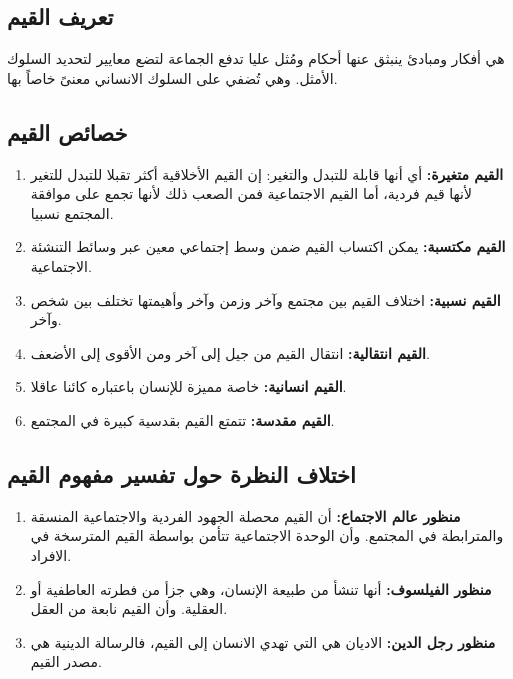 \subsection{تعريف القيم}
هي أفكار ومبادئ ينبثق عنها أحكام ومُثل عليا تدفع الجماعة لتضع معايير لتحديد
    السلوك الأمثل. وهي تُضفي على السلوك الانساني معنىً خاصاً بها.

\subsection{خصائص القيم}
\begin{enumerate}
    \item\textbf{القيم متغيرة:}
        أي أنها قابلة للتبدل والتغير: إن القيم الأخلاقية أكثر تقبلا للتبدل للتغير
        لأنها قيم فردية، أما القيم الاجتماعية فمن الصعب ذلك لأنها تجمع على موافقة
        المجتمع نسبيا.
    \item\textbf{القيم مكتسبة:}
        يمكن اكتساب القيم ضمن وسط إجتماعي معين عبر وسائط التنشئة الاجتماعية.
    \item\textbf{القيم نسبية:}
        اختلاف القيم بين مجتمع وآخر وزمن وآخر وأهيمتها تختلف بين شخص وآخر.
    \item\textbf{القيم انتقالية:}
        انتقال القيم من جيل إلى آخر ومن الأقوى إلى الأضعف.
    \item\textbf{القيم انسانية:}
        خاصة مميزة للإنسان باعتباره كائنا عاقلا.
    \item\textbf{القيم مقدسة:}
        تتمتع القيم بقدسية كبيرة في المجتمع.
\end{enumerate}

\subsection{اختلاف النظرة حول تفسير مفهوم القيم}
\begin{enumerate}
    \item\textbf{منظور عالم الاجتماع:}
        أن القيم محصلة الجهود الفردية والاجتماعية المنسقة والمترابطة في المجتمع.
        وأن الوحدة الاجتماعية تتأمن بواسطة القيم المترسخة في الافراد.
    \item\textbf{منظور الفيلسوف:}
        أنها تنشأ من طبيعة الإنسان، وهي جزأ من فطرته العاطفية أو العقلية. وأن
        القيم نابعة من العقل.
    \item\textbf{منظور رجل الدين:}
        الاديان هي التي تهدي الانسان إلى القيم، فالرسالة الدينية هي مصدر القيم.
\end{enumerate}

